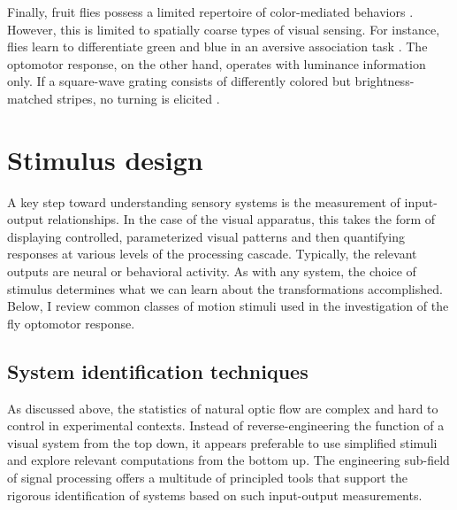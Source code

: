 Finally, fruit flies possess a limited repertoire of color-mediated behaviors \citep{Menne:1977aa}. However, this is limited to spatially coarse types of visual sensing. For instance, flies learn to differentiate green and blue in an aversive association task \citep{Schnaitmann:2013aa}. The optomotor response, on the other hand, operates with luminance information only. If a square-wave grating consists of differently colored but brightness-matched stripes, no turning is elicited \citep{Yamaguchi:2008aa}.

\section{Stimulus design}
A key step toward understanding sensory systems is the measurement of input-output relationships. In the case of the visual apparatus, this takes the form of displaying controlled, parameterized visual patterns and then quantifying responses at various levels of the processing cascade. Typically, the relevant outputs are neural or behavioral activity. As with any system, the choice of stimulus determines what we can learn about the transformations accomplished. Below, I review common classes of motion stimuli used in the investigation of the fly optomotor response.

\subsection{System identification techniques}
As discussed above, the statistics of natural optic flow are complex and hard to control in experimental contexts. Instead of reverse-engineering the function of a visual system from the top down, it appears preferable to use simplified stimuli and explore relevant computations from the bottom up. The engineering sub-field of signal processing offers a multitude of principled tools that support the rigorous identification of systems based on such input-output measurements.

